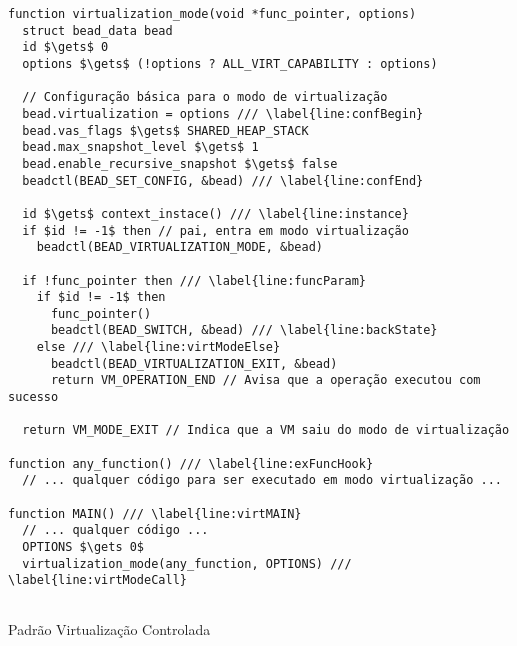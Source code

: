 \begin{pseudocode}
\begin{lstlisting}[language=pseudocode, style=pseudocode]
function virtualization_mode(void *func_pointer, options)
  struct bead_data bead
  id $\gets$ 0
  options $\gets$ (!options ? ALL_VIRT_CAPABILITY : options)

  // Configuração básica para o modo de virtualização
  bead.virtualization = options /// \label{line:confBegin}
  bead.vas_flags $\gets$ SHARED_HEAP_STACK
  bead.max_snapshot_level $\gets$ 1
  bead.enable_recursive_snapshot $\gets$ false
  beadctl(BEAD_SET_CONFIG, &bead) /// \label{line:confEnd}

  id $\gets$ context_instace() /// \label{line:instance}
  if $id != -1$ then // pai, entra em modo virtualização
    beadctl(BEAD_VIRTUALIZATION_MODE, &bead)

  if !func_pointer then /// \label{line:funcParam}
    if $id != -1$ then
      func_pointer()
      beadctl(BEAD_SWITCH, &bead) /// \label{line:backState}
    else /// \label{line:virtModeElse}
      beadctl(BEAD_VIRTUALIZATION_EXIT, &bead)
      return VM_OPERATION_END // Avisa que a operação executou com sucesso

  return VM_MODE_EXIT // Indica que a VM saiu do modo de virtualização

function any_function() /// \label{line:exFuncHook}
  // ... qualquer código para ser executado em modo virtualização ...      

function MAIN() /// \label{line:virtMAIN}
  // ... qualquer código ...
  OPTIONS $\gets 0$
  virtualization_mode(any_function, OPTIONS) /// \label{line:virtModeCall}
  
\end{lstlisting}

  \caption{Padrão Virtualização Controlada}
  \label{alg:virtMode}
\end{pseudocode}
